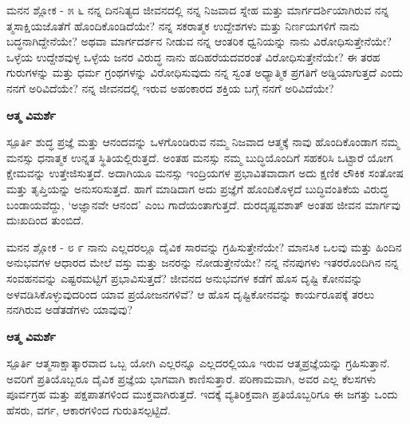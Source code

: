 \newpage
\begin{mananam}{\mananamfont \large{ಮನನ ಶ್ಲೋಕ - ೫ ೬}}
\mananamtext ನನ್ನ ದಿನನಿತ್ಯದ ಜೀವನದಲ್ಲಿ ನನ್ನ ನಿಜವಾದ ಸ್ನೇಹ ಮತ್ತು ಮಾರ್ಗದರ್ಶಿಯಾಗಿರುವ ನನ್ನ ತ್ಮಸಾಕ್ಷಿಯಜೊತೆಗೆ ಹೊಂದಿಕೊಂಡಿದೆಯೇ? ನನ್ನ ಸಕರಾತ್ಮಕ ಉದ್ದೇಶಗಳು ಮತ್ತು ನಿರ್ಣಯಗಳಿಗೆ ನಾನು ಬದ್ಧನಾಗಿದ್ದೇನೆಯೇ? ಅಥವಾ ಮಾರ್ಗದರ್ಶನ ನೀಡುವ ನನ್ನ ಆಂತರಿಕ ಧ್ವನಿಯನ್ನು ನಾನು ವಿರೋಧಿಸುತ್ತೇನೆಯೇ?\\
ಒಳ್ಳೆಯ ಉದ್ದೇಶವುಳ್ಳ ಒಳ್ಳೆಯ ಜನರ ವಿರುದ್ಧ ನಾನು ಹದಿಹರೆಯದವರಂತೆ ವಿರೋಧಿಸುತ್ತೇನೆಯೇ? ಈ ತರಹ ಗುರುಗಳನ್ನು ಮತ್ತು ಧರ್ಮ ಗ್ರಂಥಗಳನ್ನು ವಿರೋಧಿಸುವುದು ನನ್ನ ಸ್ವಂತ ಅಧ್ಯಾತ್ಮಿಕ ಪ್ರಗತಿಗೆ ಅಡ್ಡಿಯಾಗುತ್ತದೆ ಎಂದು ನನಗೆ ಅರಿವಿದೆಯೇ? ನನ್ನ ಜೀವನದಲ್ಲಿ ಇರುವ ಅಹಂಕಾರದ ಶಕ್ತಿಯ ಬಗ್ಗೆ ನನಗೆ ಅರಿವಿದೆಯೇ?
\end{mananam}
\WritingHand\enspace\textbf{ಆತ್ಮ ವಿಮರ್ಶೆ}\\
\begin{inspiration}{\mananamfont \large ಸ್ಪೂರ್ತಿ}
ಶುದ್ಧ ಪ್ರಜ್ಞೆ ಮತ್ತು ಆನಂದವನ್ನು ಒಳಗೊಂಡಿರುವ ನಮ್ಮ ನಿಜವಾದ ಆತ್ಮಕ್ಕೆ ನಾವು ಹೊಂದಿಕೊಂಡಾಗ ನಮ್ಮ ಮನಸ್ಸು ಧನಾತ್ಮಕ ಉನ್ನತ ಸ್ಥಿತಿಯಲ್ಲಿರುತ್ತದೆ. ಅಂತಹ ಮನಸ್ಸು ನಮ್ಮ ಬುದ್ಧಿಯೊಂದಿಗೆ ಸಹಕರಿಸಿ ಒಟ್ಟಾರೆ ಯೋಗ ಕ್ಷೇಮವನ್ನು ಉತ್ತೇಜಿಸುತ್ತದೆ. ಅದಾಗಿಯೂ ಮನಸ್ಸು ಇಂದ್ರಿಯಗಳ ಪ್ರಭಾವಿತವಾದಾಗ ಅದು ಕ್ಷಣಿಕ ಲೌಕಿಕ ಸಂತೋಷ ಮತ್ತು ತೃಪ್ತಿಯನ್ನು ಅನುಸರಿಸುತ್ತದೆ. ಹಾಗೆ ಮಾಡಿದಾಗ ಅದು ಪ್ರಜ್ಞೆಗೆ ಹೊಂದಿಕೊಳ್ಳದೆ ಬುದ್ಧಿವಂತಿಕೆಯ ವಿರುದ್ಧ ಬಂಡಾಯವೆದ್ದು, ‘ಅಜ್ಞಾನವೇ ಆನಂದ’ ಎಂಬ ಗಾದೆಯಂತಾಗುತ್ತದೆ. ದುರದೃಷ್ಟವಶಾತ್ ಅಂತಹ ಜೀವನ ಮಾರ್ಗವು ದುಃಖದಿಂದ ತುಂಬಿದೆ. 
\end{inspiration}
\newpage

\newpage
\begin{mananam}{\mananamfont \large{ಮನನ ಶ್ಲೋಕ - ೮ ೯}}
\mananamtext ನಾನು ಎಲ್ಲದರಲ್ಲೂ ದೈವಿಕ ಸಾರವನ್ನು ಗ್ರಹಿಸುತ್ತೇನೆಯೇ? ಮಾನಸಿಕ ಒಲವು ಮತ್ತು ಹಿಂದಿನ ಅನುಭವಗಳ ಆಧಾರದ ಮೇಲೆ ವಸ್ತು ಮತ್ತು ಜನರನ್ನು ನೋಡುತ್ತೇನೆಯೇ? ನನ್ನ ನೆನಪುಗಳು ಇತರರೊಂದಿಗಿನ ನನ್ನ ಸಂವಹನವನ್ನು ಎಷ್ಟರಮಟ್ಟಿಗೆ   ಪ್ರಭಾವಿಸುತ್ತದೆ? ಜೀವನದ ಅನುಭವಗಳ ಕಡೆಗೆ ಹೊಸ ದೃಷ್ಟಿ ಕೋನವನ್ನು ಅಳವಡಿಸಿಕೊಳ್ಳುವುದರಿಂದ ಯಾವ ಪ್ರಯೋಜನಗಳಿವೆ? ಆ ಹೊಸ ದೃಷ್ಟಿಕೋನವನ್ನು ಕಾರ್ಯರೂಪಕ್ಕೆ ತರಲು ನನಗಿರುವ ಅಡೆತಡೆಗಳು ಯಾವುವು?
\end{mananam}
\WritingHand\enspace\textbf{ಆತ್ಮ ವಿಮರ್ಶೆ}\\
\begin{inspiration}{\mananamfont \large ಸ್ಪೂರ್ತಿ}
ಆತ್ಮಸಾಕ್ಷಾತ್ಕಾರವಾದ ಒಬ್ಬ ಯೋಗಿ ಎಲ್ಲರನ್ನೂ ಎಲ್ಲದರಲ್ಲಿಯೂ ಇರುವ ಆತ್ಮಪ್ರಜ್ಞೆಯನ್ನು ಗ್ರಹಿಸುತ್ತಾನೆ. ಅವರಿಗೆ ಪ್ರತಿಯೊಬ್ಬರೂ ದೈವಿಕ ಪ್ರಜ್ಞೆಯ ಭಾಗವಾಗಿ ಕಾಣಿಸುತ್ತಾರೆ. ಪರಿಣಾಮವಾಗಿ, ಅವರ ಎಲ್ಲ ಕೆಲಸಗಳು ಪೂರ್ವಗ್ರಹ ಮತ್ತು ಪಕ್ಷಪಾತಗಳಿಂದ ಮುಕ್ತವಾಗಿರುತ್ತದೆ. ಇದಕ್ಕೆ ವ್ಯತಿರಿಕ್ತವಾಗಿ ಪ್ರತಿಯೊಬ್ಬರಿಗೂ ಈ ಜಗತ್ತು ಒಂದು ಹೆಸರು, ವರ್ಗ, ಆಕಾರಗಳಿಂದ ಗುರುತಿಸಲ್ಪಟ್ಟಿದೆ.
\end{inspiration}
\newpage


